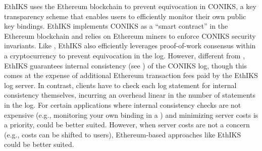 %
EthIKS\cite{ethiks} uses the Ethereum blockchain\cite{ethereum} to prevent equivocation in CONIKS\cite{coniks}, a key transparency scheme that enables users to efficiently monitor their own public key bindings.
EthIKS implements CONIKS as a ``smart contract'' in the Ethereum blockchain and relies on Ethereum miners to enforce CONIKS security invariants.
Like \Sys, EthIKS also efficiently leverages proof-of-work consensus within a cryptocurrency to prevent equivocation in the log.
However, different from \Sys, EthIKS guarantees internal consistency (see ) of the CONIKS log, though this comes at the expense of additional Ethereum transaction fees paid by the EthIKS log server\cite{ethiks}.
In contrast, \Sys clients have to check each log statement for internal consistency themselves, incurring an overhead linear in the number of statements in the log.
For certain applications where internal consistency checks are not expensive (e.g., monitoring your own binding in a \pkd) and minimizing server costs is a priority, \Sys could be better suited.
However, when server costs are not a concern (e.g., costs can be shifted to users), Ethereum-based approaches like EthIKS could be better suited.
